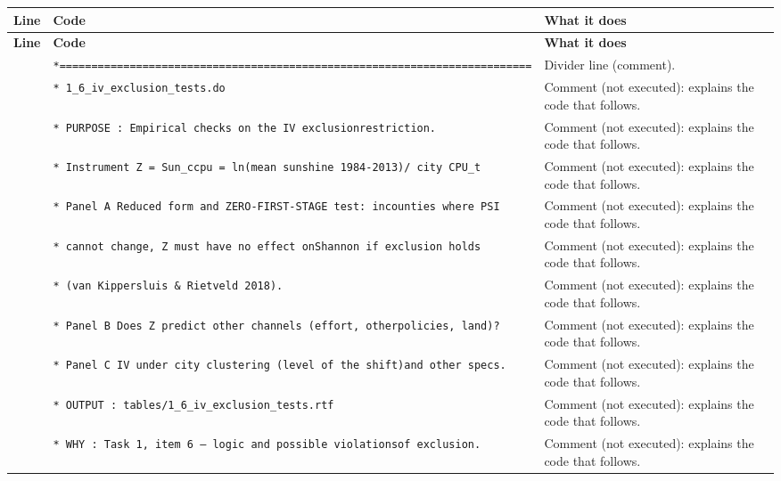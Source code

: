 \documentclass[10pt]{article}
\newcommand{\codetable}[1]{%
{\footnotesize
\begin{longtable}{>{\raggedleft\arraybackslash}p{0.55cm}>{\raggedright\arraybackslash}p{8.3cm}>{\raggedright\arraybackslash}p{8.0cm}}
\toprule \textbf{Line} & \textbf{Code} & \textbf{What it does}\\ \midrule \endfirsthead
\toprule \textbf{Line} & \textbf{Code} & \textbf{What it does}\\ \midrule \endhead
\bottomrule \endfoot
#1
\end{longtable}}}
\begin{document}
\codetable{1 & \texttt{*=========================================================\newline \hspace*{1em}=================} & Divider line (comment).\\
2 & \texttt{* 1\_6\_iv\_exclusion\_tests.do} & Comment (not executed): explains the code that follows.\\
3 & \texttt{* PURPOSE : Empirical checks on the IV exclusion\newline \hspace*{1em}restriction.} & Comment (not executed): explains the code that follows.\\
4 & \texttt{*   Instrument Z = Sun\_ccpu = ln(mean sunshine 1984-{}2013)\newline \hspace*{1em}/ city CPU\_t} & Comment (not executed): explains the code that follows.\\
5 & \texttt{*   Panel A  Reduced form and ZERO-{}FIRST-{}STAGE test: in\newline \hspace*{1em}counties where PSI} & Comment (not executed): explains the code that follows.\\
6 & \texttt{*            cannot change, Z must have no effect on\newline \hspace*{1em}Shannon if exclusion holds} & Comment (not executed): explains the code that follows.\\
7 & \texttt{*            (van Kippersluis \& Rietveld 2018).} & Comment (not executed): explains the code that follows.\\
8 & \texttt{*   Panel B  Does Z predict other channels (effort, other\newline \hspace*{1em}policies, land)?} & Comment (not executed): explains the code that follows.\\
9 & \texttt{*   Panel C  IV under city clustering (level of the shift)\newline \hspace*{1em}and other specs.} & Comment (not executed): explains the code that follows.\\
10 & \texttt{* OUTPUT  : tables/1\_6\_iv\_exclusion\_tests.rtf} & Comment (not executed): explains the code that follows.\\
11 & \texttt{* WHY     : Task 1, item 6 — logic and possible violations\newline \hspace*{1em}of exclusion.} & Comment (not executed): explains the code that follows.\\
}
\end{document}
